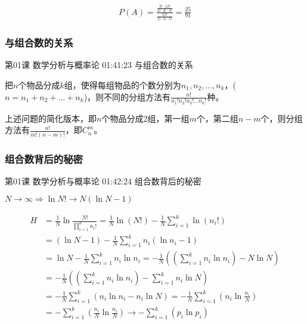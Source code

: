 \documentclass[UTF8]{ctexart}
\begin{document}
\begin{equation}
\begin{aligned}
P(A)=\frac{\frac{3!\cdot12!}{4!\cdot4!\cdot4!}}{\frac{15!}{5!\cdot5!\cdot5!}}=\frac{25}{91}
\end{aligned}
\end{equation}

\subsubsection{与组合数的关系}

第01课 数学分析与概率论 01:41:23 与组合数的关系

把$n$个物品分成$k$组，使得每组物品的个数分别为$n_{1},n_{2},\dots,n_{k}$，($n=n_{1}+n_{2}+\dots+n_{k}$)，则不同的分组方法有$\frac{n!}{n_{1}!n_{2}!n_{3}!\dots n_{k}!}$种。

上述问题的简化版本，即$n$个物品分成2组，第一组$m$个，第二组$n-m$个，则分组方法有$\frac{n!}{m!(n-m)!}$，即$C_{n}^{m}$。

\subsubsection{组合数背后的秘密}

第01课 数学分析与概率论 01:42:24 组合数背后的秘密

$N \rightarrow \infty \Rightarrow \ln N! \rightarrow N(\ln N -1)$

\begin{equation}
\begin{aligned}
H&=\frac{1}{N} \ln \frac{N!}{\prod_{i=1}^{k}n_{i}!}=\frac{1}{N} \ln (N!) - \frac{1}{N} \sum_{i=1}^{k} \ln (n_{i}!) \\
&=(\ln N -1)-\frac{1}{N} \sum_{i=1}^{k} n_{i}(\ln n_{i}-1) \\
&=\ln N-\frac{1}{N} \sum_{i=1}^{k} n_{i}\ln n_{i}
=-\frac{1}{N} \left (  \left (  \sum_{i=1}^{k} n_{i}\ln n_{i}  \right ) - N\ln N\right ) \\
&= -\frac{1}{N} \left (  \left (  \sum_{i=1}^{k} n_{i}\ln n_{i}  \right ) - \sum_{i=1}^{k} n_{i} \ln N\right ) \\
&=-\frac{1}{N} \sum_{i=1}^{k} \left (  n_{i}\ln n_{i} - n_{i}\ln N  \right )
=-\frac{1}{N} \sum_{i=1}^{k} \left ( n_{i}\ln \frac{n_{i}}{N} \right ) \\
&=-\sum_{i=1}^{k} \left ( \frac{n_{i}}{N}  \ln \frac{n_{i}}{N} \right )
\rightarrow -\sum_{i=1}^{k} \left ( p_{i} \ln p_{i}  \right )
\end{aligned}
\end{equation}
\end{document}
